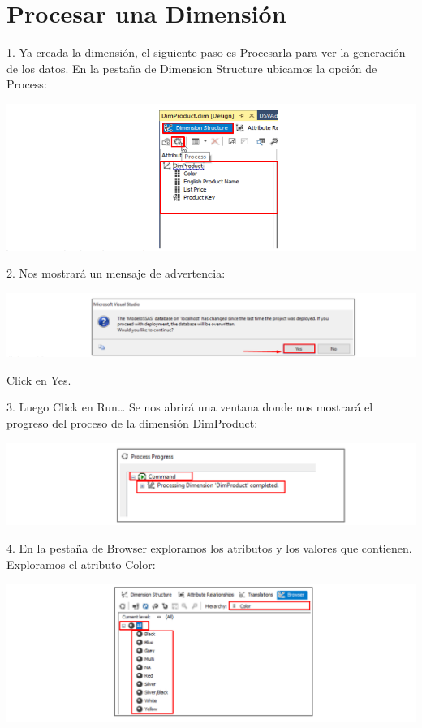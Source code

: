 \section{Procesar una Dimensión} 

1. Ya creada la dimensión, el siguiente paso es Procesarla para ver la generación de los datos. En la pestaña
de Dimension Structure ubicamos la opción de Process:

	\begin{center}
	\includegraphics[width=\columnwidth]{images/task2/img13}
	\end{center}	

2. Nos mostrará un mensaje de advertencia:

	\begin{center}
	\includegraphics[width=\columnwidth]{images/task2/img14}
    \end{center}	
    
Click en Yes.

3. Luego Click en Run…
Se nos abrirá una ventana donde nos mostrará el progreso del proceso de la dimensión DimProduct:
	\begin{center}
	\includegraphics[width=\columnwidth]{images/task2/img17}
    \end{center}	
    

4. En la pestaña de Browser exploramos los atributos y los valores que contienen.
Exploramos el atributo Color:

	\begin{center}
	\includegraphics[width=\columnwidth]{images/task2/img19}
    \end{center}	
    
